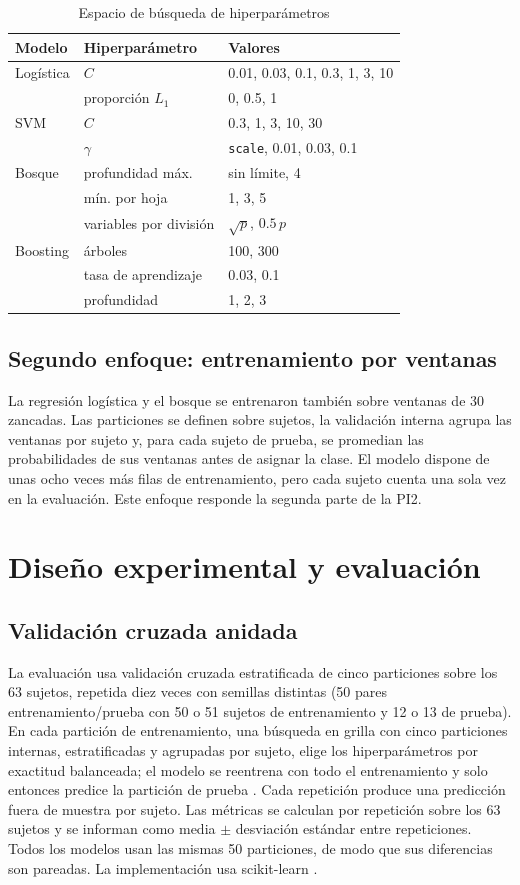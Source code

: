 \documentclass[conference]{IEEEtran}
\begin{document}
\begin{table}[t]
\caption{Espacio de búsqueda de hiperparámetros}
\label{tab:grilla}
\centering
\footnotesize
\begin{tabular}{@{}lll@{}}
\toprule
Modelo & Hiperparámetro & Valores \\
\midrule
Logística & $C$ & 0.01, 0.03, 0.1, 0.3, 1, 3, 10 \\
 & proporción $L_1$ & 0, 0.5, 1 \\
SVM & $C$ & 0.3, 1, 3, 10, 30 \\
 & $\gamma$ & \texttt{scale}, 0.01, 0.03, 0.1 \\
Bosque & profundidad máx. & sin límite, 4 \\
 & mín. por hoja & 1, 3, 5 \\
 & variables por división & $\sqrt{p}$, $0.5\,p$ \\
Boosting & árboles & 100, 300 \\
 & tasa de aprendizaje & 0.03, 0.1 \\
 & profundidad & 1, 2, 3 \\
\bottomrule
\end{tabular}
\end{table}

\subsection{Segundo enfoque: entrenamiento por ventanas}
La regresión logística y el bosque se entrenaron también sobre ventanas de 30 zancadas. Las particiones se definen sobre sujetos, la validación interna agrupa las ventanas por sujeto y, para cada sujeto de prueba, se promedian las probabilidades de sus ventanas antes de asignar la clase. El modelo dispone de unas ocho veces más filas de entrenamiento, pero cada sujeto cuenta una sola vez en la evaluación. Este enfoque responde la segunda parte de la PI2.

\section{Diseño experimental y evaluación}

\subsection{Validación cruzada anidada}
La evaluación usa validación cruzada estratificada de cinco particiones sobre los 63 sujetos, repetida diez veces con semillas distintas (50 pares entrenamiento/prueba con 50 o 51 sujetos de entrenamiento y 12 o 13 de prueba). En cada partición de entrenamiento, una búsqueda en grilla con cinco particiones internas, estratificadas y agrupadas por sujeto, elige los hiperparámetros por exactitud balanceada; el modelo se reentrena con todo el entrenamiento y solo entonces predice la partición de prueba \cite{cawley2010,varoquaux2018}. Cada repetición produce una predicción fuera de muestra por sujeto. Las métricas se calculan por repetición sobre los 63 sujetos y se informan como media $\pm$ desviación estándar entre repeticiones. Todos los modelos usan las mismas 50 particiones, de modo que sus diferencias son pareadas. La implementación usa scikit-learn \cite{pedregosa2011}.
\end{document}
